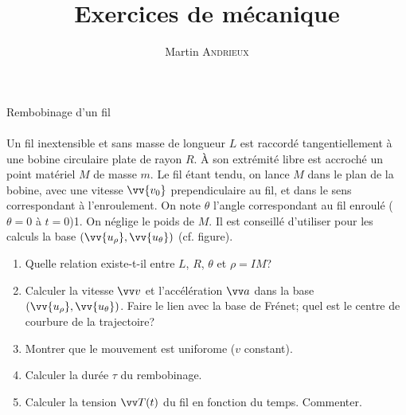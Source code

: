\documentclass[french, a4paper, 11pt]{article}
\title{Exercices de mécanique}
\author{Martin \textsc{Andrieux}}
\date{}
\newcommand{\po}{\left(}         %
\newcommand{\pf}{\right)}        %
\newcommand{\pof}[1]{\po #1 \pf} %
\newcommand{\vect}[1]{\vv{#1}}
\newcommand{\uth}{\vect{u_\theta}}    %
\newcommand{\urho}{\vv{u_\rho}}       %
\begin{document}
\maketitle

\begin{cadre}{Rembobinage d'un fil}
  \paragraph*{}
  \begin{minipage}{0.6\linewidth}
    Un fil inextensible et sans masse de longueur $L$ est raccordé tangentiellement à une bobine circulaire plate de rayon $R$.
    À son extrémité libre est accroché un point matériel $M$ de masse $m$. Le fil étant tendu, on lance $M$ dans le plan de la bobine, avec une vitesse $\vv{v_{0}}$ prependiculaire au fil, et dans le sens correspondant à l'enroulement.
    On note $\theta$ l'angle correspondant au fil enroulé ($\theta = 0$ à $t=0$)1. On néglige le poids de $M$. Il est conseillé d'utiliser pour les calculs la base $\pof{\urho, \uth}$ (cf. figure).
    \begin{enumerate}[label=\upshape\alph*)]
      \item Quelle relation existe-t-il entre $L$, $R$, $\theta$ et $\rho = IM$?
      \item Calculer la vitesse $\vv v$ et l'accélération $\vv a$ dans la base $\pof{\urho, \uth}$. Faire le lien avec la base de Frénet; quel est le centre de courbure de la trajectoire?
      \item Montrer que le mouvement est uniforome ($v$ constant).
      \item Calculer la durée $\tau$ du rembobinage.
      \item Calculer la tension $\vv T(t)$ du fil en fonction du temps. Commenter.
    \end{enumerate}
  \end{minipage}
  \begin{minipage}{0.35\linewidth}
  \end{minipage}
\end{cadre}
\end{document}
